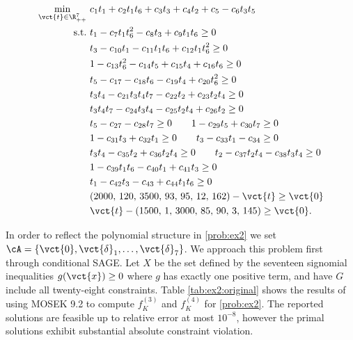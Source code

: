 \begin{align}
\min_{\vct{t} \in \R^7_{++}} 
            &~    c_1 t_1 + c_2 t_1 t_6 + c_3 t_3 + c_4 t_2 + c_5 - c_6 t_3 t_5                   \label{prob:ex2} \\
\text{s.t.} &~ t_1 - c_{7} t_1 t_{6}^{2}- c_{8} t_{3} + c_{9} t_1 t_{6} \geq 0 \nonumber \\
&~ t_3 - c_{10} t_{1} - c_{11} t_{1} t_{6} + c_{12} t_{1} t_{6}^{2} \geq 0 \nonumber \\
&~ 1 - c_{13} t_{6}^{2}- c_{14} t_{5} + c_{15} t_{4} + c_{16} t_{6} \geq 0 \nonumber \\
&~ t_5 - c_{17} - c_{18} t_{6}- c_{19} t_{4} + c_{20} t_{6}^{2} \geq 0 \nonumber \\
&~ t_3 t_4 - c_{21} t_3 t_4 t_7 - c_{22} t_{2} + c_{23} t_{2} t_4 \geq 0 \nonumber \\
&~ t_3 t_4 t_7 - c_{24} t_3 t_4 - c_{25} t_{2} t_{4} + c_{26} t_{2} \geq 0 \nonumber \\
&~ t_5 - c_{27} - c_{28} t_{7} \geq 0 \qquad 1 - c_{29} t_{5} + c_{30} t_{7} \geq 0 \nonumber \\
&~ 1 - c_{31} t_{3} + c_{32} t_{1} \geq 0 \qquad t_3 - c_{33} t_{1} - c_{34} \geq 0 \nonumber \\
&~ t_3 t_4 - c_{35} t_{2} + c_{36} t_{2} t_4 \geq 0 \qquad t_2 - c_{37} t_2 t_{4} - c_{38} t_{3} t_{4} \geq 0 \nonumber \\
&~ 1 - c_{39} t_{1} t_{6}- c_{40} t_{1} + c_{41} t_{3} \geq 0 \nonumber \\
&~ t_1 - c_{42} t_{3}- c_{43} + c_{44} t_1 t_{6} \geq 0 \nonumber \\
&~ (2000,\, 120,\, 3500,\, 93,\, 95,\, 12,\, 162) - \vct{t} \geq \vct{0} \nonumber \\
&~ \vct{t} - (1500,\, 1,\, 3000,\, 85,\, 90,\, 3,\, 145) \geq \vct{0}. \nonumber
\end{align}



In order to reflect the polynomial structure in \eqref{prob:ex2} we set $\cA = \{\vct{0},\vct{\delta}_1,\ldots,\vct{\delta}_7\}$.
We approach this problem first through conditional SAGE.
Let $X$ be the set defined by the seventeen signomial inequalities $g(\vct{x}) \geq 0$ where $g$ has exactly one positive term, and have $G$ include all twenty-eight constraints.
Table \ref{tab:ex2:original} shows the results of using MOSEK 9.2 to compute $f_K^{(3)}$ and $f_K^{(4)}$ for \eqref{prob:ex2}.
The reported solutions are feasible up to relative error at most $10^{-8}$, however the primal solutions exhibit substantial absolute constraint violation.


